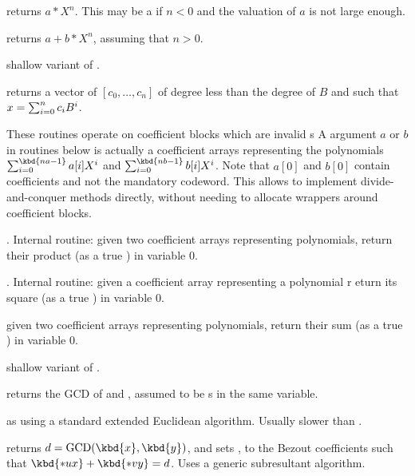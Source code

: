  returns $a * X^n$. This may
be a  if $n < 0$ and the valuation of $a$ is not large
enough.

 returns $a + b * X^n$, assuming
that $n > 0$.

 shallow
variant of .

 returns a vector of 
$[c_0,\ldots,c_n]$ of degree less than the degree of $B$ and such that
$x=\sum_{i=0}^{n}{c_i\*B^i}$.


These routines operate on coefficient blocks which are invalid s
A  argument $a$ or $b$ in routines below is actually a coefficient
arrays representing the polynomials
 $\sum_{i = 0}^{\kbd{na-1}} a[i] X^i$ and
 $\sum_{i = 0}^{\kbd{nb-1}} b[i] X^i$. Note that $a[0]$ and $b[0]$ contain
coefficients and not the mandatory  codeword. This allows to implement
divide-and-conquer methods directly, without needing to allocate wrappers
around coefficient blocks.

. Internal routine:
given two coefficient arrays representing polynomials, return their product (as
a true ) in variable $0$.

. Internal routine:
given a coefficient array representing a polynomial r eturn its square (as a
true ) in variable $0$.

given two coefficient arrays representing polynomials, return their sum (as a
true ) in variable $0$.

 shallow
variant of .


 returns the GCD of  and ,
assumed to be s in the same variable.

 as  using a standard
extended Euclidean algorithm. Usually slower than .

 returns
$d = \text{GCD}(\kbd{x},\kbd{y})$, and sets ,  to the Bezout
coefficients such that $\kbd{*ux} + \kbd{*vy} = d$. Uses a generic
subresultant algorithm.

